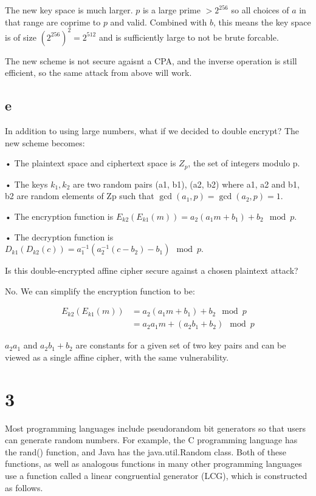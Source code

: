 \documentclass[11pt]{article}
\begin{document}
The new key space is much larger. $p$ is a large prime $> 2^{256}$ so all choices of $a$ in that range are coprime to $p$ and valid. Combined with $b$, this means the key space is of size $(2^{256})^2 = 2^{512}$ and is sufficiently large to not be brute forcable.

The new scheme is not secure agaisnt a CPA, and the inverse operation is still efficient, so the same attack from above will work.

\subsection{e} In addition to using large numbers, what if we decided to double encrypt? The new
scheme becomes:

• The plaintext space and ciphertext space is $Z_p$, the set of integers modulo p.

• The keys $k_1, k_2$ are two random pairs (a1, b1), (a2, b2) where a1, a2 and b1, b2 are random elements of Zp such that $\gcd(a_1, p) = \gcd(a_2, p) = 1$.

• The encryption function is $E_{k2} (E_{k1} (m)) = a_2(a_1 m + b_1) + b_2 \mod p$.

• The decryption function is $D_{k1} (D_{k2} (c)) = a^{-1}_1 (a^{-1}_2 (c - b_2) - b_1) \mod p$.

Is this double-encrypted aﬃne cipher secure against a chosen plaintext attack?

No. We can simplify the encryption function to be:

\begin{align*}
    E_{k2}(E_{k1}(m)) &= a_2(a_1 m + b_1) + b_2 \mod p \\
    &= a_2 a_1 m + (a_2 b_1 + b_2) \mod p
\end{align*}

$a_2 a_1$ and $a_2 b_1 + b_2$ are constants for a given set of two key pairs and can be viewed as a single affine cipher, with the same vulnerability.

\section{3}

Most programming languages include pseudorandom bit generators so that users can generate random numbers. For example, the C programming language has the rand() function, and Java has the java.util.Random class. Both of these functions, as well as analogous functions in many other programming languages use a function called a linear congruential generator (LCG), which is constructed as follows.
\end{document}

